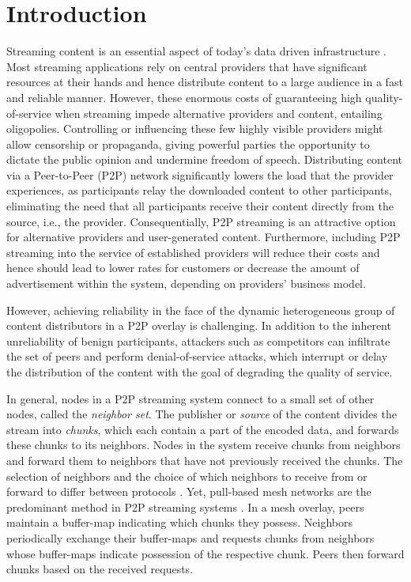 \section{Introduction}
\label{sec:intro}

Streaming content is an essential aspect of today's data driven infrastructure \cite{emule}.
Most streaming applications rely on central providers that have significant resources at their hands and hence distribute content to a large audience in a fast and reliable manner. 
However, these enormous costs of guaranteeing high quality-of-service when streaming impede alternative providers and content, entailing oligopolies.
Controlling or influencing these few highly visible providers might allow censorship or propaganda, giving powerful parties the opportunity  to dictate the public opinion and undermine freedom of speech.
Distributing content via a Peer-to-Peer (P2P) network significantly lowers the load that the provider experiences, as participants relay the downloaded content to other participants, eliminating the need that all participants receive their content directly from the source, i.e., the provider. 
Consequentially, P2P streaming is an attractive option for alternative providers and user-generated content.
Furthermore, including P2P streaming into the service of established providers will reduce their costs and hence should lead to lower rates for customers or decrease the amount of advertisement within the system, depending on providers' business model. 


However, achieving reliability in the face of the dynamic heterogeneous group of content distributors in a P2P overlay is challenging. In addition to the inherent unreliability of benign participants, attackers such as competitors can infiltrate the set of peers and perform denial-of-service attacks, which interrupt or delay the distribution of the content with the goal of degrading the quality of service. 

In general, nodes in a P2P streaming system connect to a small set of other nodes, called the \emph{neighbor set}. 
The publisher or \emph{source} of the content divides the stream into \emph{chunks}, which each contain a part of the encoded data, and forwards these chunks to its neighbors. Nodes in the system receive chunks from neighbors and forward them to neighbors that have not previously received the chunks. 
The selection of neighbors and the choice of which neighbors to receive from or forward to differ between protocols \cite{sasi2014survey}.  Yet, pull-based mesh networks are the predominant method in P2P streaming systems \cite{zhang2014modeling}. In a mesh overlay, peers maintain a buffer-map indicating which chunks they possess.  Neighbors periodically exchange their buffer-maps and requests chunks from neighbors whose buffer-maps indicate possession of the respective chunk. Peers then forward chunks based on the received requests. 



